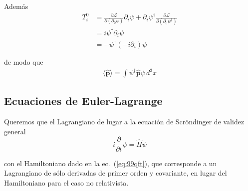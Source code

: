 \begin{frame}
Además
\begin{align}
    T^0_i&=\frac{\partial\mathcal{L}}{\partial\left(\partial_0\psi\right)}\partial_i\psi+\partial_i\psi^\dagger\frac{\partial\mathcal{L}}{\partial\left(\partial_0\psi^\dagger\right)}\nonumber\\
    &=i\psi^\dagger\partial_i\psi\nonumber\\
    &=-\psi^\dagger(-i\partial_i)\psi
\end{align}

de modo que
\begin{align}
\langle\hat{\mathbf{p}}\rangle=\int\psi^\dagger\hat{\mathbf{p}}\psi\,d^3 x
\end{align}
\end{frame}

\subsection{Ecuaciones de Euler-Lagrange}
\label{sec:ecuaciones-de-euler}

\begin{frame}
Queremos que el Lagrangiano de lugar a la ecuación de Scröndinger de validez general
\begin{equation}
  \label{eq:grlsch}
  i\frac{\partial}{\partial t}\psi=\hat{H} \psi
\end{equation}
\end{frame}
con el Hamiltoniano dado en la ec.~(\ref{eq:99qft}), que corresponde a un Lagrangiano de sólo derivadas de primer orden y covariante, en lugar del Hamiltoniano para el caso no relativista. 

